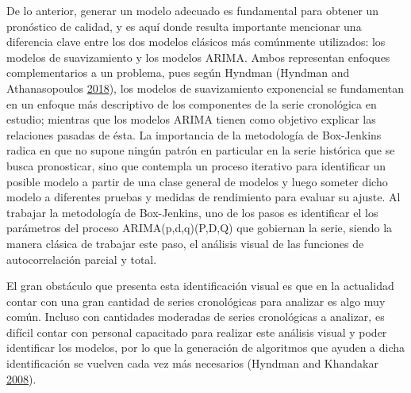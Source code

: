 \documentclass[12pt]{article}
\begin{document}
De lo anterior, generar un modelo adecuado es fundamental para obtener
un pronóstico de calidad, y es aquí donde resulta importante mencionar
una diferencia clave entre los dos modelos clásicos más comúnmente
utilizados: los modelos de suavizamiento y los modelos ARIMA. Ambos
representan enfoques complementarios a un problema, pues según Hyndman
(Hyndman and Athanasopoulos
\protect\hyperlink{ref-hyndman2018forecasting}{2018}), los modelos de
suavizamiento exponencial se fundamentan en un enfoque más descriptivo
de los componentes de la serie cronológica en estudio; mientras que los
modelos ARIMA tienen como objetivo explicar las relaciones pasadas de
ésta. La importancia de la metodología de Box-Jenkins radica en que no
supone ningún patrón en particular en la serie histórica que se busca
pronosticar, sino que contempla un proceso iterativo para identificar un
posible modelo a partir de una clase general de modelos y luego someter
dicho modelo a diferentes pruebas y medidas de rendimiento para evaluar
su ajuste. Al trabajar la metodología de Box-Jenkins, uno de los pasos
es identificar el los parámetros del proceso ARIMA(p,d,q)(P,D,Q) que
gobiernan la serie, siendo la manera clásica de trabajar este paso, el
análisis visual de las funciones de autocorrelación parcial y total.

El gran obstáculo que presenta esta identificación visual es que en la
actualidad contar con una gran cantidad de series cronológicas para
analizar es algo muy común. Incluso con cantidades moderadas de series
cronológicas a analizar, es difícil contar con personal capacitado para
realizar este análisis visual y poder identificar los modelos, por lo
que la generación de algoritmos que ayuden a dicha identificación se
vuelven cada vez más necesarios (Hyndman and Khandakar
\protect\hyperlink{ref-auto.arima}{2008}).
\end{document}
